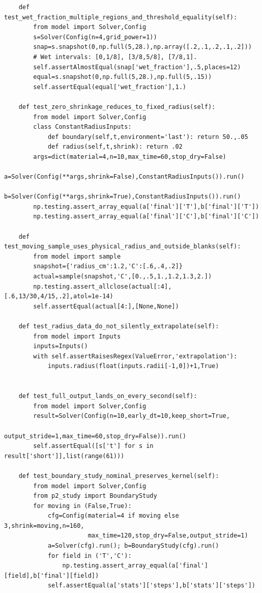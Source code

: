\begin{verbatim}
    def test_wet_fraction_multiple_regions_and_threshold_equality(self):
        from model import Solver,Config
        s=Solver(Config(n=4,grid_power=1))
        snap=s.snapshot(0,np.full(5,28.),np.array([.2,.1,.2,.1,.2]))
        # Wet intervals: [0,1/8], [3/8,5/8], [7/8,1].
        self.assertAlmostEqual(snap['wet_fraction'],.5,places=12)
        equal=s.snapshot(0,np.full(5,28.),np.full(5,.15))
        self.assertEqual(equal['wet_fraction'],1.)

    def test_zero_shrinkage_reduces_to_fixed_radius(self):
        from model import Solver,Config
        class ConstantRadiusInputs:
            def boundary(self,t,environment='last'): return 50.,.05
            def radius(self,t,shrink): return .02
        args=dict(material=4,n=10,max_time=60,stop_dry=False)
        a=Solver(Config(**args,shrink=False),ConstantRadiusInputs()).run()
        b=Solver(Config(**args,shrink=True),ConstantRadiusInputs()).run()
        np.testing.assert_array_equal(a['final']['T'],b['final']['T'])
        np.testing.assert_array_equal(a['final']['C'],b['final']['C'])

    def test_moving_sample_uses_physical_radius_and_outside_blanks(self):
        from model import sample
        snapshot={'radius_cm':1.2,'C':[.6,.4,.2]}
        actual=sample(snapshot,'C',[0.,.5,1.,1.2,1.3,2.])
        np.testing.assert_allclose(actual[:4],[.6,13/30,4/15,.2],atol=1e-14)
        self.assertEqual(actual[4:],[None,None])

    def test_radius_data_do_not_silently_extrapolate(self):
        from model import Inputs
        inputs=Inputs()
        with self.assertRaisesRegex(ValueError,'extrapolation'):
            inputs.radius(float(inputs.radii[-1,0])+1,True)


    def test_full_output_lands_on_every_second(self):
        from model import Solver,Config
        result=Solver(Config(n=10,early_dt=10,keep_short=True,
                             output_stride=1,max_time=60,stop_dry=False)).run()
        self.assertEqual([s['t'] for s in result['short']],list(range(61)))

    def test_boundary_study_nominal_preserves_kernel(self):
        from model import Solver,Config
        from p2_study import BoundaryStudy
        for moving in (False,True):
            cfg=Config(material=4 if moving else 3,shrink=moving,n=160,
                       max_time=120,stop_dry=False,output_stride=1)
            a=Solver(cfg).run(); b=BoundaryStudy(cfg).run()
            for field in ('T','C'):
                np.testing.assert_array_equal(a['final'][field],b['final'][field])
            self.assertEqual(a['stats']['steps'],b['stats']['steps'])


\end{verbatim}
